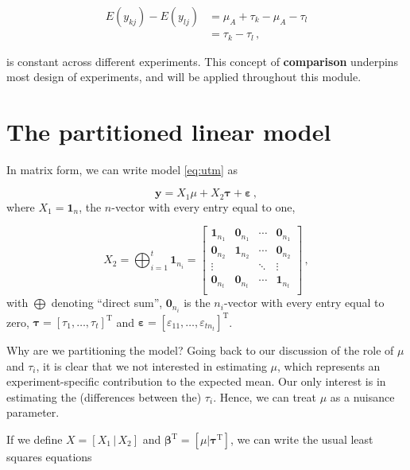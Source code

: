 \documentclass[
]{book}
\theoremstyle{definition}
\theoremstyle{definition}
\theoremstyle{definition}
\theoremstyle{definition}
\theoremstyle{remark}
\begin{document}
\begin{align*}
E(y_{kj}) - E(y_{lj}) & = \mu_A + \tau_k - \mu_A - \tau_l \\
& = \tau_k - \tau_l\,,
\end{align*}

is constant across different experiments. This concept of \textbf{comparison} underpins most design of experiments, and will be applied throughout this module.

\hypertarget{the-partitioned-linear-model}{%
\section{The partitioned linear model}\label{the-partitioned-linear-model}}

In matrix form, we can write model \eqref{eq:utm} as

\[
\boldsymbol{y}= X_1\mu + X_2\boldsymbol{\tau}+ \boldsymbol{\varepsilon}\,,
\]
where \(X_1 = \boldsymbol{1}_n\), the \(n\)-vector with every entry equal to one,

\[
X_2 = \bigoplus_{i = 1}^t \boldsymbol{1}_{n_i} = \begin{bmatrix}
\boldsymbol{1}_{n_1} & \boldsymbol{0}_{n_1} & \cdots &  \boldsymbol{0}_{n_1} \\
\boldsymbol{0}_{n_2} & \boldsymbol{1}_{n_2} & \cdots &  \boldsymbol{0}_{n_2} \\
\vdots & & \ddots & \vdots \\
\boldsymbol{0}_{n_t} & \boldsymbol{0}_{n_t} & \cdots &  \boldsymbol{1}_{n_t} \\
\end{bmatrix}\,,
\]
with \(\bigoplus\) denoting ``direct sum'', \(\boldsymbol{0}_{n_i}\) is the \(n_i\)-vector with every entry equal to zero, \(\boldsymbol{\tau}= [\tau_1, \ldots, \tau_t]^{\mathrm{T}}\) and \(\boldsymbol{\varepsilon}= [\varepsilon_{11}, \ldots, \varepsilon_{tn_t}]^{\mathrm{T}}\).

Why are we partitioning the model? Going back to our discussion of the role of \(\mu\) and \(\tau_i\), it is clear that we not interested in estimating \(\mu\), which represents an experiment-specific contribution to the expected mean. Our only interest is in estimating the (differences between the) \(\tau_i\). Hence, we can treat \(\mu\) as a nuisance parameter.

If we define \(X = [X_1\, \vert\, X_2]\) and \(\boldsymbol{\beta}^{\mathrm{T}} = [\mu \vert \boldsymbol{\tau}^{\mathrm{T}}]\), we can write the usual least squares equations
\end{document}
